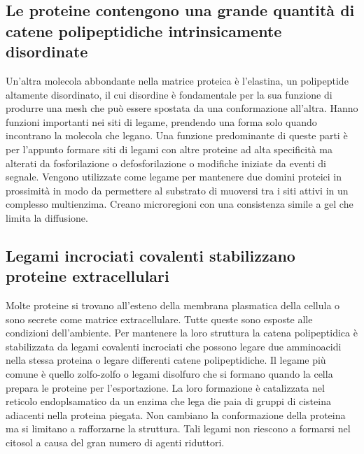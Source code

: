 \subsection{Le proteine contengono una grande quantit\`a di catene polipeptidiche intrinsicamente disordinate}
Un'altra molecola abbondante nella matrice proteica \`e l'elastina, un polipeptide altamente disordinato, il cui disordine \`e fondamentale per la sua funzione di produrre una mesh che
pu\`o essere spostata da una conformazione all'altra. Hanno funzioni importanti nei siti di legame, prendendo una forma solo quando incontrano la molecola che legano. Una funzione 
predominante di queste parti \`e per l'appunto formare siti di legami con altre proteine ad alta specificit\`a ma alterati da fosforilazione o defosforilazione o modifiche iniziate da
eventi di segnale. Vengono utilizzate come legame per mantenere due domini proteici in prossimit\`a in modo da permettere al substrato di muoversi tra i siti attivi in un complesso 
multienzima. Creano microregioni con una consistenza simile a gel che limita la diffusione. 
\subsection{Legami incrociati covalenti stabilizzano proteine extracellulari}
Molte proteine si trovano all'esteno della membrana plasmatica della cellula o sono secrete come matrice extracellulare. Tutte queste sono esposte alle condizioni dell'ambiente. Per 
mantenere la loro struttura la catena polipeptidica \`e stabilizzata da legami covalenti incrociati che possono legare due amminoacidi nella stessa proteina o legare differenti catene
polipeptidiche. Il legame pi\`u comune \`e quello zolfo-zolfo o legami disolfuro che si formano quando la cella prepara le proteine per l'esportazione. La loro formazione \`e catalizzata
nel reticolo endoplsamatico da un enzima che lega die paia di gruppi  di cisteina adiacenti nella proteina piegata. Non cambiano la conformazione della proteina ma si limitano
a rafforzarne la struttura. Tali legami non riescono a formarsi nel citosol a causa del gran numero di agenti riduttori.
